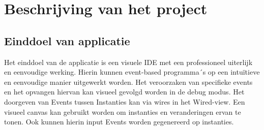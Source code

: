 \documentclass[]{article}
\begin{document}
\section{Beschrijving van het project}
\label{Beschrijving}
\subsection{Einddoel van applicatie}
Het einddoel van de applicatie is een visuele IDE met een professioneel uiterlijk en eenvoudige werking. Hierin kunnen event-based programma´s op een intu\"itieve en eenvoudige manier uitgewerkt worden. Het veroorzaken van specifieke events en het opvangen hiervan kan visueel gevolgd worden in de debug modus. Het doorgeven van Events tussen Instanties kan via wires in het Wired-view. Een visueel canvas kan gebruikt worden om instanties en veranderingen ervan te tonen. Ook kunnen hierin input Events worden gegenereerd op instanties.
\end{document}
